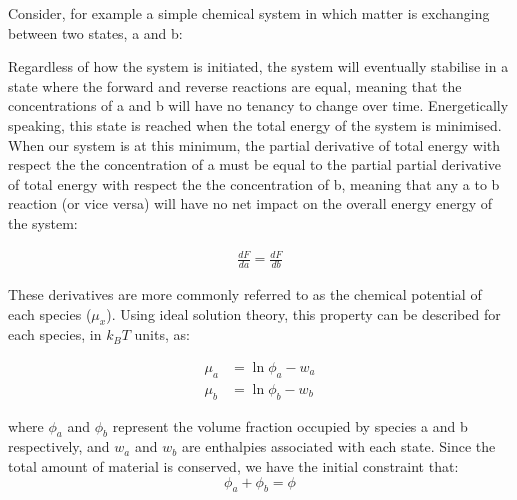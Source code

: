 \documentclass[12pt]{"article"}
\begin{document}


Consider, for example a simple chemical system in which matter is exchanging between two states, a and b:
\begin{center}
\end{center}

Regardless of how the system is initiated, the system will eventually stabilise in a state where the forward and reverse reactions are equal, meaning that the concentrations of a and b will have no tenancy to change over time. Energetically speaking, this state is reached when the total energy of the system is minimised. When our system is at this minimum, the partial derivative of total energy with respect the the concentration of a must be equal to the partial partial derivative of total energy with respect the the concentration of b, meaning that any a to b reaction (or vice versa) will have no net impact on the overall energy energy of the system:

\begin{align}
\frac{dF}{da} = \frac{dF}{db}
\end{align}

These derivatives are more commonly referred to as the chemical potential of each species ($\mu_x$). Using ideal solution theory, this property can be described for each species, in $k_BT$ units, as:

\begin{align}
\mu_a &= \ln\phi_a - w_a\\
\mu_b &= \ln\phi_b - w_b
\end{align} 

where $\phi_a$ and $\phi_b$ represent the volume fraction occupied by species a and b respectively, and $w_a$ and $w_b$ are enthalpies associated with each state. Since the total amount of material is conserved, we have the initial constraint that:
\begin{equation}
\phi_a + \phi_b = \phi
\end{equation}
\end{document}
